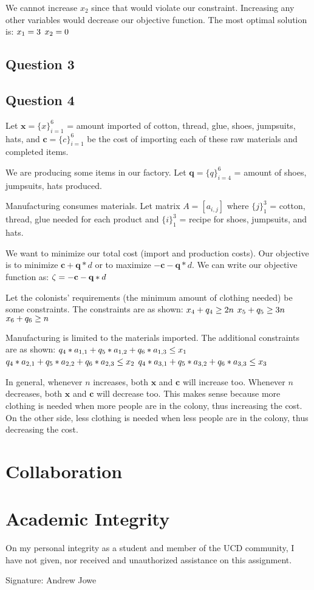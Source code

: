 \documentclass{article}
\begin{document}
We cannot increase $x_2$ since that would violate our constraint. Increasing any other variables would decrease our objective function. The most optimal solution is:
$\\x_1 = 3$
$\\x_2 = 0$


\newpage
\subsection*{Question 3}

\newpage
\subsection*{Question 4}
Let $\textbf{x} = \{x\}_{i=1}^6$ = amount imported of cotton, thread, glue, shoes, jumpsuits, hats, and $\textbf{c} = \{c\}_{i=1}^6$ be the cost of importing each of these raw materials and completed items.

We are producing some items in our factory. Let $\textbf{q} = \{q\}_{i=4}^6$ = amount of shoes, jumpsuits, hats produced.

Manufacturing consumes materials. Let matrix $A = [a_{i,j}]$ where $\{j\}_1^3$ = cotton, thread, glue needed for each product and $\{i\}_1^3$ = recipe for shoes, jumpsuits, and hats.

We want to minimize our total cost (import and production costs). Our objective is to minimize $\textbf{c}+\textbf{q}*d$ or to maximize $-\textbf{c}-\textbf{q}*d$. We can write our objective function as:
$\\\zeta = -\textbf{c}-\textbf{q}*d$

Let the colonists' requirements (the minimum amount of clothing needed) be some constraints. The constraints are as shown:
$\\x_4 + q_4 \geq 2n$
$\\x_5 + q_5 \geq 3n$
$\\x_6 + q_6 \geq n$

Manufacturing is limited to the materials imported. The additional constraints are as shown:
$\\q_4*a_{1,1} + q_5*a_{1,2} + q_6*a_{1,3} \leq x_1$
$\\q_4*a_{2,1} + q_5*a_{2,2} + q_6*a_{2,3} \leq x_2$
$\\q_4*a_{3,1} + q_5*a_{3,2} + q_6*a_{3,3} \leq x_3$

In general, whenever $n$ increases, both $\textbf{x}$ and $\textbf{c}$ will increase too. Whenever $n$ decreases, both $\textbf{x}$ and $\textbf{c}$ will decrease too. This makes sense because more clothing is needed when more people are in the colony, thus increasing the cost. On the other side, less clothing is needed when less people are in the colony, thus decreasing the cost.

\newpage
\section*{Collaboration}

\newpage
\section*{Academic Integrity}
On my personal integrity as a student and member of the UCD community, I have not given, nor received and unauthorized assistance on this assignment.

Signature: Andrew Jowe
\end{document}
